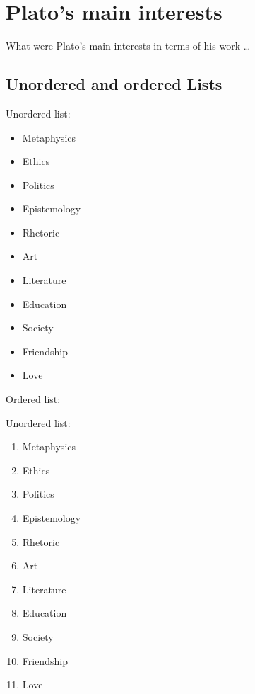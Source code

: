 \documentclass[11pt]{article}
\begin{document}
	\section{Plato's main interests} %
		What were Plato's main interests in terms of his work \ldots

		\subsection{Unordered and ordered Lists}
			Unordered list:
			\begin{itemize}[label=$\ast$, align=right]
    		  	\item Metaphysics
				\item Ethics
				\item Politics
				\item Epistemology
				\item Rhetoric
				\item Art
				\item Literature
				\item Education
				\item Society
				\item Friendship
				\item Love
			\end{itemize}

			Ordered list:

			Unordered list:

			\begin{enumerate}
    			\item Metaphysics
				\item Ethics
				\item Politics
				\item Epistemology
				\item Rhetoric
				\item Art
				\item Literature
				\item Education
				\item Society
				\item Friendship
				\item Love
			\end{enumerate}
\end{document}
